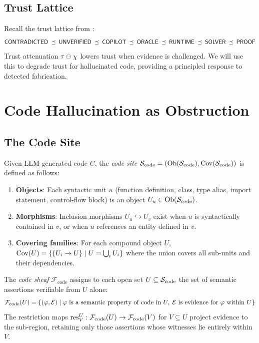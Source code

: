 \documentclass[11pt]{article}
\newcommand{\CodeSheaf}{\mathcal{F}_{\mathrm{code}}}
\newcommand{\CodeSite}{\Site_{\mathrm{code}}}
\begin{document}
\subsection{Trust Lattice}
Recall the trust lattice from \JuGeo:
\[
  \mathsf{CONTRADICTED} \;\preceq\; \mathsf{UNVERIFIED} \;\preceq\; \mathsf{COPILOT} \;\preceq\;
  \mathsf{ORACLE} \;\preceq\; \mathsf{RUNTIME} \;\preceq\; \mathsf{SOLVER} \;\preceq\; \mathsf{PROOF}
\]
Trust attenuation $\tau \ominus \chi$ lowers trust when evidence is
challenged.  We will use this to degrade trust for hallucinated code,
providing a principled response to detected fabrication.


\section{Code Hallucination as Obstruction}\label{sec:hallucination-model}

\subsection{The Code Site}

\begin{definition}\label{def:code-site}
Given LLM-generated code $C$, the \emph{code site}
$\CodeSite = (\Ob(\CodeSite), \Cov(\CodeSite))$ is defined as follows:
\begin{enumerate}[noitemsep]
  \item \textbf{Objects}: Each syntactic unit $u$ (function definition,
        class, type alias, import statement, control-flow block) is
        an object $U_u \in \Ob(\CodeSite)$.
  \item \textbf{Morphisms}: Inclusion morphisms $U_u \hookrightarrow U_v$
        exist when $u$ is syntactically contained in $v$, or when $u$
        references an entity defined in $v$.
  \item \textbf{Covering families}: For each compound object $U$,
        $\mathrm{Cov}(U) = \{\{U_i \to U\} \mid U = \bigcup_i U_i\}$
        where the union covers all sub-units and their dependencies.
\end{enumerate}
\end{definition}

\begin{definition}\label{def:code-sheaf}
The \emph{code sheaf} $\CodeSheaf$ assigns to each open set $U \subseteq \CodeSite$
the set of semantic assertions verifiable from $U$ alone:
\[
  \CodeSheaf(U) = \{(\prop, \evid) \mid \prop \text{ is a semantic property
  of code in } U, \; \evid \text{ is evidence for } \prop \text{ within } U\}
\]
The restriction maps $\res^U_V : \CodeSheaf(U) \to \CodeSheaf(V)$ for
$V \subseteq U$ project evidence to the sub-region, retaining only
those assertions whose witnesses lie entirely within $V$.
\end{definition}
\end{document}
